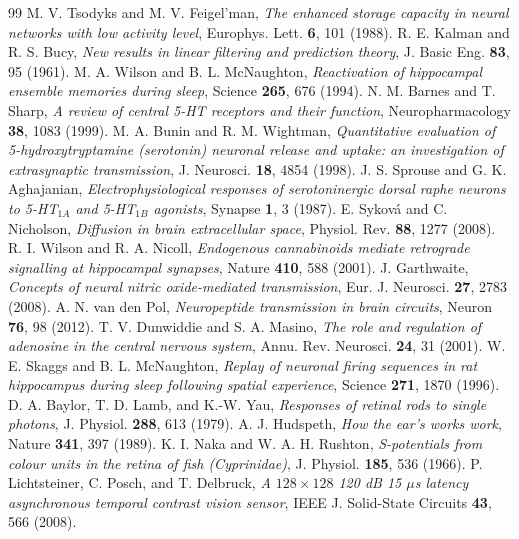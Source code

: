 \begin{thebibliography}{99}
 M. V. Tsodyks and M. V. Feigel'man, \emph{The enhanced storage capacity in neural networks with low activity level}, Europhys. Lett. \textbf{6}, 101 (1988).
 R. E. Kalman and R. S. Bucy, \emph{New results in linear filtering and prediction theory}, J. Basic Eng. \textbf{83}, 95 (1961).
 M. A. Wilson and B. L. McNaughton, \emph{Reactivation of hippocampal ensemble memories during sleep}, Science \textbf{265}, 676 (1994).
 N. M. Barnes and T. Sharp, \emph{A review of central 5-HT receptors and their function}, Neuropharmacology \textbf{38}, 1083 (1999).
 M. A. Bunin and R. M. Wightman, \emph{Quantitative evaluation of 5-hydroxytryptamine (serotonin) neuronal release and uptake: an investigation of extrasynaptic transmission}, J. Neurosci. \textbf{18}, 4854 (1998).
 J. S. Sprouse and G. K. Aghajanian, \emph{Electrophysiological responses of serotoninergic dorsal raphe neurons to 5-HT$_{1A}$ and 5-HT$_{1B}$ agonists}, Synapse \textbf{1}, 3 (1987).
 E. Syková and C. Nicholson, \emph{Diffusion in brain extracellular space}, Physiol. Rev. \textbf{88}, 1277 (2008).
 R. I. Wilson and R. A. Nicoll, \emph{Endogenous cannabinoids mediate retrograde signalling at hippocampal synapses}, Nature \textbf{410}, 588 (2001).
 J. Garthwaite, \emph{Concepts of neural nitric oxide-mediated transmission}, Eur. J. Neurosci. \textbf{27}, 2783 (2008).
 A. N. van den Pol, \emph{Neuropeptide transmission in brain circuits}, Neuron \textbf{76}, 98 (2012).
 T. V. Dunwiddie and S. A. Masino, \emph{The role and regulation of adenosine in the central nervous system}, Annu. Rev. Neurosci. \textbf{24}, 31 (2001).
 W. E. Skaggs and B. L. McNaughton, \emph{Replay of neuronal firing sequences in rat hippocampus during sleep following spatial experience}, Science \textbf{271}, 1870 (1996).
 D. A. Baylor, T. D. Lamb, and K.-W. Yau, \emph{Responses of retinal rods to single photons}, J. Physiol. \textbf{288}, 613 (1979).
 A. J. Hudspeth, \emph{How the ear's works work}, Nature \textbf{341}, 397 (1989).
 K. I. Naka and W. A. H. Rushton, \emph{S-potentials from colour units in the retina of fish (Cyprinidae)}, J. Physiol. \textbf{185}, 536 (1966).
 P. Lichtsteiner, C. Posch, and T. Delbruck, \emph{A $128\times128$ 120 dB 15 $\mu$s latency asynchronous temporal contrast vision sensor}, IEEE J. Solid-State Circuits \textbf{43}, 566 (2008).

\end{thebibliography}

